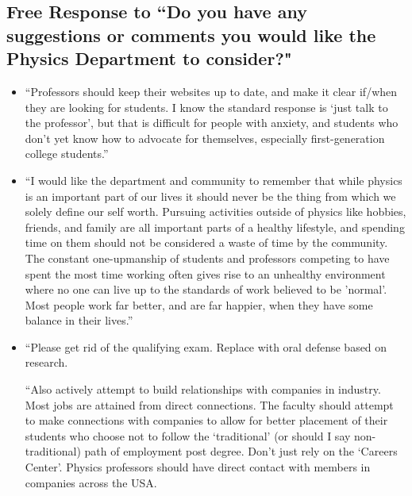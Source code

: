 \documentclass[oneside]{book}   %
\begin{document}
\subsection{Free Response to ``Do you have any suggestions or comments you would like the Physics Department to consider?"}

\begin{itemize}
	\item “Professors should keep their websites up to date, and make it clear if/when they are looking for students. I know the standard response is ‘just talk to the professor’, but that is difficult for people with anxiety, and students who don't yet know how to advocate for themselves, especially first-generation college students.”
	\item “I would like the department and community to remember that while physics is an important part of our lives it should never be the thing from which we solely define our self worth. Pursuing activities outside of physics like hobbies, friends, and family are all important parts of a healthy lifestyle, and spending time on them should not be considered a waste of time by the community. The constant one-upmanship of students and professors competing to have spent the most time working often gives rise to an unhealthy environment where no one can live up to the standards of work 	believed to be 'normal'. Most people work far better, and are far happier, when they have some balance in their lives.”
	\item “Please get rid of the qualifying exam. Replace with oral defense based on 	research.

“Also actively attempt to build relationships with companies in industry. Most jobs are attained from direct connections. The faculty should attempt to make connections with companies to allow for better placement of their students who choose not to follow the ‘traditional’ (or should I say non-traditional) path of 	employment post degree. Don't just rely on the ‘Careers Center’. Physics professors should have direct contact with members in companies across the USA.


\end{itemize}
\end{document}
